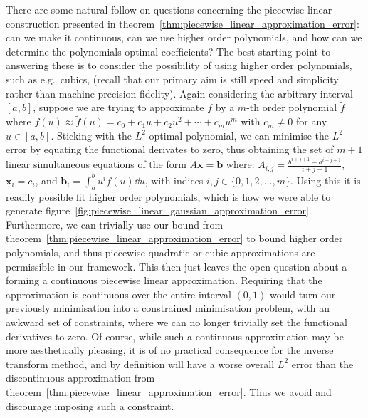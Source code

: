 \documentclass[manuscript,review]{acmart}
\begin{document}
There are some natural follow on questions concerning the piecewise linear construction presented in theorem~\ref{thm:piecewise_linear_approximation_error}: can we make it continuous, can we use higher order polynomials, and how can we determine the polynomials optimal coefficients? The best starting point to answering these is to consider the possibility of using higher order polynomials, such as e.g.\ cubics, (recall that our primary aim is still speed and simplicity rather than machine precision fidelity). Again considering the arbitrary interval $ [a,b] $, suppose we are trying to approximate $ f $ by a $ m $-th order polynomial $ \tilde{f} $ where $ f(u) \approx \tilde{f}(u) = c_0 + c_1 u + c_2 u^2 + \cdots + c_m u^m $ with $ c_m \neq 0 $ for any $ u \in [a,b] $. Sticking with the $ L^2 $ optimal polynomial, we can minimise the $ L^2 $ error by equating the functional derivates to zero, thus obtaining the set of $ m + 1 $ linear simultaneous equations of the form $ A\bm{x} = \bm{b} $ where: $ A_{i,j} = \tfrac{b^{i+j+1} - a^{i+j+1}}{i+j+1} $, $ \bm{x}_i = c_i $, and $ \bm{b}_{i} = \int_{a}^{b} u^i f(u) \dd{u} $, with indices $ i,j \in \{0,1,2,\ldots,m\} $. Using this it is readily possible fit higher order polynomials, which is how we were able to generate figure~\ref{fig:piecewise_linear_gaussian_approximation_error}. Furthermore, we can trivially use our bound from theorem~\ref{thm:piecewise_linear_approximation_error} to bound higher order polynomials, and thus piecewise quadratic or cubic approximations are permissible in our framework. This then just leaves the open question about a forming a continuous piecewise linear approximation. Requiring that the approximation is continuous over the entire interval $ (0, 1) $ would turn our previously minimisation into a constrained minimisation problem, with an awkward set of constraints, where we can no longer trivially set the functional derivatives to zero.  Of course, while such a continuous approximation may be more aesthetically pleasing, it is of no practical consequence for the inverse transform method, and by definition will have a worse overall $ L^2 $ error than the discontinuous approximation from theorem~\ref{thm:piecewise_linear_approximation_error}. Thus we avoid and discourage imposing such a constraint. 
\end{document}
